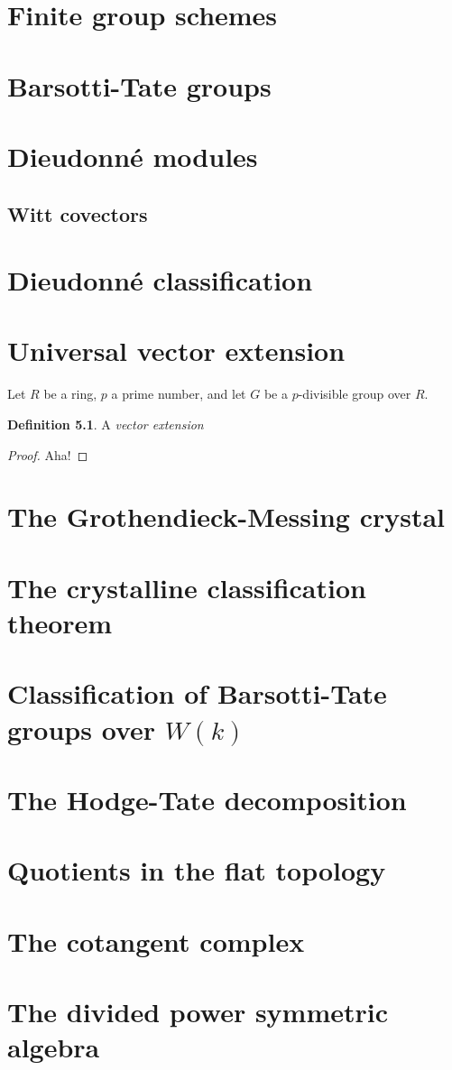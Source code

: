 \documentclass{amsbook}
\theoremstyle{definition}
\newtheorem{definition}{Definition}
\begin{document}
\mainmatter

\tableofcontents

\chapter{Finite group schemes}

\chapter{Barsotti-Tate groups}

\chapter{Dieudonné modules}

\section{Witt covectors}

\chapter{Dieudonné classification}

\chapter{Universal vector extension}

Let $R$ be a ring, $p$ a prime number, and let $G$ be a $p$-divisible group over
$R$.

\begin{definition}
  A \emph{vector extension}
\end{definition}

\begin{proof}
  Aha!
\end{proof}

\chapter{The Grothendieck-Messing crystal}

\chapter{The crystalline classification theorem}

\chapter{Classification of Barsotti-Tate groups over $W(k)$}

\chapter{The Hodge-Tate decomposition}

\appendix

\chapter{Quotients in the flat topology}

\chapter{The cotangent complex}

\chapter{The divided power symmetric algebra}
\end{document}
